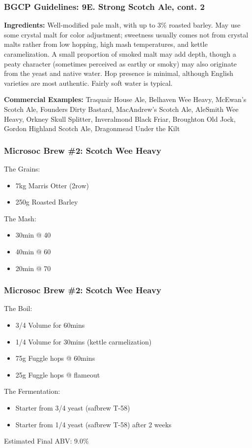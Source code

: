 \documentclass{beamer}
\begin{document}
\begin{frame}
  \frametitle{BGCP Guidelines: 9E. Strong Scotch Ale, cont. 2}
  {\footnotesize

\textbf{Ingredients:} Well-modified pale malt, with up to 3\% roasted barley. May use some crystal malt for color adjustment; sweetness usually comes not from crystal malts rather from low hopping, high mash temperatures, and kettle caramelization. A small proportion of smoked malt may add depth, though a peaty character (sometimes perceived as earthy or smoky) may also originate from the yeast and native water. Hop presence is minimal, although English varieties are most authentic. Fairly soft water is typical.

\textbf{Commercial Examples:} Traquair House Ale, Belhaven Wee Heavy, McEwan's Scotch Ale, Founders Dirty Bastard, MacAndrew's Scotch Ale, AleSmith Wee Heavy, Orkney Skull Splitter, Inveralmond Black Friar, Broughton Old Jock, Gordon Highland Scotch Ale, Dragonmead Under the Kilt}
\end{frame}

\begin{frame}
\frametitle{Microsoc Brew \#2: Scotch Wee Heavy}
The Grains:
\begin{itemize}
\item 7kg Marris Otter (2row)
\item 250g Roasted Barley
\end{itemize}
The Mash:
\begin{itemize}
\item 30min @ 40\degree
\item 40min @ 60\degree
\item 20min @ 70\degree
\end{itemize}
\end{frame}

\begin{frame}
\frametitle{Microsoc Brew \#2: Scotch Wee Heavy}

The Boil:
\begin{itemize}
\item 3/4 Volume for 60mins
\item 1/4 Volume for 30mins (kettle carmelization)
\item 75g Fuggle hops @ 60mins
\item 25g Fuggle hops @ flameout
\end{itemize}
The Fermentation:
\begin{itemize}
\item Starter from 3/4 yeast (safbrew T-58)
\item Starter from 1/4 yeast (safbrew T-58) after 2 weeks
\end{itemize}

Estimated Final ABV: 9.0\%

\end{frame}
\end{document}
